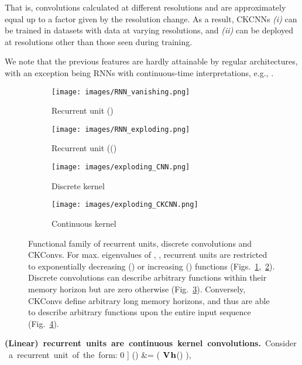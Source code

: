 \documentclass{article}
\newcommand{\mat}[1]{\ensuremath{{\mathbf{\MakeUppercase{{#1}}}}}}
\renewcommand{\vec}[1]{\ensuremath{\mathbf{\MakeLowercase{{#1}}}}}
\newcommand{\Vm}{\mat{V}}
\newcommand{\yv}{\vec{y}}
\newcommand{\hv}{\vec{h}}
\begin{document}
That is, convolutions calculated at different resolutions  and  are approximately equal up to a factor given by the resolution change. As a result, CKCNNs \emph{(i)} can be trained in datasets with data at varying resolutions, and \emph{(ii)} can be deployed at resolutions other than those seen during training.

We note that the previous features are hardly attainable by regular architectures, with an exception being RNNs with continuous-time interpretations, e.g., \citet{gu2020hippo,kidger2020neural}.

\begin{figure}
     \centering
     \begin{subfigure}[b]{0.24\textwidth}
         \centering
         \texttt{[image: images/RNN\_vanishing.png]}
         \caption{Recurrent unit ()}
         \label{fig:vanishing_rnn}
     \end{subfigure}
     \hfill
     \begin{subfigure}[b]{0.24\textwidth}
         \centering
         \texttt{[image: images/RNN\_exploding.png]}
         \caption{Recurrent unit (()}
         \label{fig:exploding_rnn}
     \end{subfigure}
     \hfill
     \begin{subfigure}[b]{0.24\textwidth}
         \centering
         \texttt{[image: images/exploding\_CNN.png]}
         \caption{Discrete kernel}
         \label{fig:exploding_conv}
     \end{subfigure}
     \hfill
     \begin{subfigure}[b]{0.24\textwidth}
         \centering
         \texttt{[image: images/exploding\_CKCNN.png]}
         \caption{Continuous kernel}
         \label{fig:exploding_ckconv}
     \end{subfigure}
     \vspace{-2.8mm}
        \caption{Functional family of recurrent units, discrete convolutions and CKConvs. For max. eigenvalues of , , recurrent units are restricted to exponentially decreasing () or increasing () functions  (Figs.~\ref{fig:vanishing_rnn},~\ref{fig:exploding_rnn}). Discrete convolutions can describe arbitrary functions within their memory horizon but are zero otherwise (Fig.~\ref{fig:exploding_conv}). Conversely, CKConvs define arbitrary long memory horizons, and thus are able to describe arbitrary functions upon the entire input sequence (Fig.~\ref{fig:exploding_ckconv}).
        \vspace{-3.5mm}}
        \label{fig:vanishing_exploding_analysis}
\end{figure}
\textbf{(Linear)~recurrent~units~are~continuous~kernel~convolutions.}~Consider~a~recurrent~unit~of~the~form:
0 \jot]
 \tilde{\yv}(\tau) &= ( \Vm \hv (\tau) ),
\end{document}
